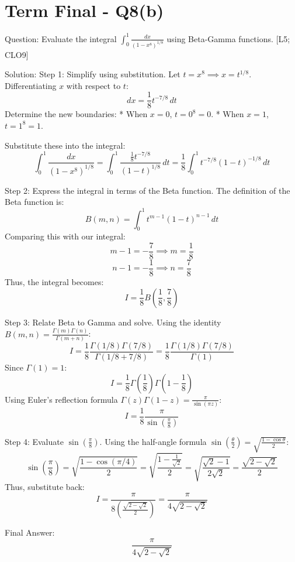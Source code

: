 \documentclass[11pt, a4paper]{article}
\begin{document}
\section*{Term Final - Q8(b)}

Question:
Evaluate the integral $\int_{0}^{1} \frac{dx}{(1-x^8)^{1/8}}$ using Beta-Gamma functions. [L5; CLO9]

Solution:
Step 1: Simplify using substitution.
Let $t = x^8 \implies x = t^{1/8}$.
Differentiating $x$ with respect to $t$:
\[
dx = \frac{1}{8} t^{-7/8} \, dt
\]
Determine the new boundaries:
* When $x = 0$, $t = 0^8 = 0$.
* When $x = 1$, $t = 1^8 = 1$.

Substitute these into the integral:
\[
\int_{0}^{1} \frac{dx}{(1-x^8)^{1/8}} = \int_{0}^{1} \frac{\frac{1}{8} t^{-7/8}}{(1-t)^{1/8}} \, dt = \frac{1}{8} \int_{0}^{1} t^{-7/8} (1-t)^{-1/8} \, dt
\]

Step 2: Express the integral in terms of the Beta function.
The definition of the Beta function is:
\[
B(m, n) = \int_{0}^{1} t^{m-1} (1-t)^{n-1} \, dt
\]
Comparing this with our integral:
\[
m - 1 = -\frac{7}{8} \implies m = \frac{1}{8}
\]
\[
n - 1 = -\frac{1}{8} \implies n = \frac{7}{8}
\]
Thus, the integral becomes:
\[
I = \frac{1}{8} B\left(\frac{1}{8}, \frac{7}{8}\right)
\]

Step 3: Relate Beta to Gamma and solve.
Using the identity $B(m, n) = \frac{\Gamma(m)\Gamma(n)}{\Gamma(m+n)}$:
\[
I = \frac{1}{8} \frac{\Gamma(1/8)\Gamma(7/8)}{\Gamma(1/8 + 7/8)} = \frac{1}{8} \frac{\Gamma(1/8)\Gamma(7/8)}{\Gamma(1)}
\]
Since $\Gamma(1) = 1$:
\[
I = \frac{1}{8} \Gamma\left(\frac{1}{8}\right)\Gamma\left(1 - \frac{1}{8}\right)
\]
Using Euler's reflection formula $\Gamma(z)\Gamma(1-z) = \frac{\pi}{\sin(\pi z)}$:
\[
I = \frac{1}{8} \frac{\pi}{\sin(\frac{\pi}{8})}
\]

Step 4: Evaluate $\sin(\frac{\pi}{8})$.
Using the half-angle formula $\sin(\frac{\theta}{2}) = \sqrt{\frac{1-\cos\theta}{2}}$:
\[
\sin\left(\frac{\pi}{8}\right) = \sqrt{\frac{1-\cos(\pi/4)}{2}} = \sqrt{\frac{1 - \frac{1}{\sqrt{2}}}{2}} = \sqrt{\frac{\sqrt{2}-1}{2\sqrt{2}}} = \frac{\sqrt{2-\sqrt{2}}}{2}
\]
Thus, substitute back:
\[
I = \frac{\pi}{8 \left( \frac{\sqrt{2-\sqrt{2}}}{2} \right)} = \frac{\pi}{4\sqrt{2-\sqrt{2}}}
\]

Final Answer:
\[
\boxed{\frac{\pi}{4\sqrt{2-\sqrt{2}}}}
\]


\end{document}
